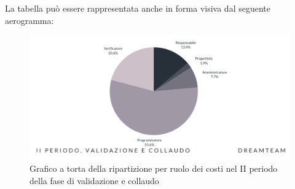 La tabella può essere rappresentata anche in forma visiva dal seguente aerogramma:
\begin{figure}[!h]
\centering
\includegraphics[scale=0.65]{Sezioni/SezioniPreventivo/grafici/Validazione_II_periodo_costi.png}
\caption{Grafico a torta della ripartizione per ruolo dei costi nel II periodo della fase di validazione e collaudo}
\end{figure}



